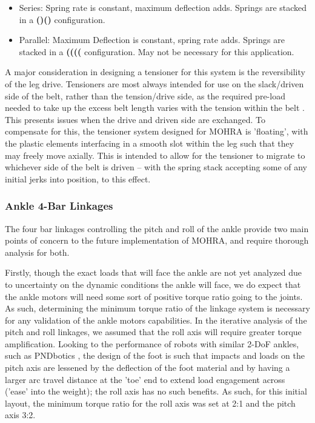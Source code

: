 \documentclass{article}
\begin{document}
\begin{itemize}
    \item Series: Spring rate is constant, maximum deflection adds. Springs are stacked in a \textbf{ ()() } configuration.

    \item Parallel: Maximum Deflection is constant, spring rate adds. Springs are stacked in a \textbf{ (((( } configuration. May not be necessary for this application.
\end{itemize}

A major consideration in designing a tensioner for this system is the reversibility of the leg drive. Tensioners are most always intended for use on the slack/driven side of the belt, rather than the tension/drive side, as the required pre-load needed to take up the excess belt length varies with the tension within the belt \cite{manheim_belt_2005}. This presents issues when the drive and driven side are exchanged. To compensate for this, the tensioner system designed for MOHRA is 'floating', with the plastic elements interfacing in a smooth slot within the leg such that they may freely move axially. This is intended to allow for the tensioner to migrate to whichever side of the belt is driven -- with the spring stack accepting some of any initial jerks into position, to this effect.

\subsubsection{Ankle 4-Bar Linkages}

The four bar linkages controlling the pitch and roll of the ankle provide two main points of concern to the future implementation of MOHRA, and require thorough analysis for both.

Firstly, though the exact loads that will face the ankle are not yet analyzed due to uncertainty on the dynamic conditions the ankle will face, we do expect that the ankle motors will need some sort of positive torque ratio going to the joints. As such, determining the minimum torque ratio of the linkage system is necessary for any validation of the ankle motors capabilities. In the iterative analysis of the pitch and roll linkages, we assumed that the roll axis will require greater torque amplification. Looking to the performance of robots with similar 2-DoF ankles, such as PNDbotics \cite{pndbotics_adam_vid_2024}, the design of the foot is such that impacts and loads on the pitch axis are lessened by the deflection of the foot material and by having a larger arc travel distance at the 'toe' end to extend load engagement across ('ease' into the weight); the roll axis has no such benefits. As such, for this initial layout, the minimum torque ratio for the roll axis was set at 2:1 and the pitch axis 3:2. 
\end{document}
